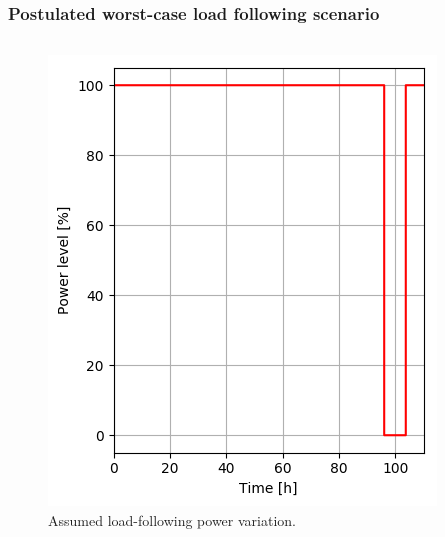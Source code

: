 \begin{frame}
\frametitle{Postulated worst-case load following scenario}
\vspace{-7mm}
\begin{columns}
	\column[t]{5.5cm}
	\begin{figure}[t]
		\includegraphics[width=\linewidth]{./images/power_load_curve.png}
		\vspace{-6mm}
		\caption{Assumed load-following power variation.}
	\end{figure}
	

\end{columns}
\end{frame}
